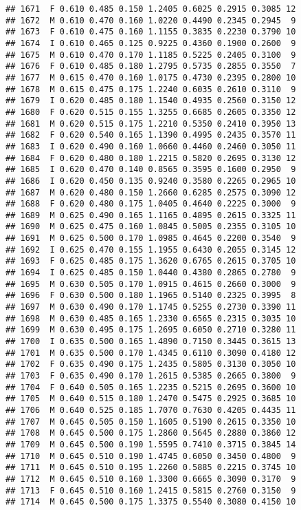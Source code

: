 \documentclass[
]{article}
\begin{document}
\begin{verbatim}
## 1671  F 0.610 0.485 0.150 1.2405 0.6025 0.2915 0.3085 12
## 1672  M 0.610 0.470 0.160 1.0220 0.4490 0.2345 0.2945  9
## 1673  F 0.610 0.475 0.160 1.1155 0.3835 0.2230 0.3790 10
## 1674  I 0.610 0.465 0.125 0.9225 0.4360 0.1900 0.2600  9
## 1675  M 0.610 0.470 0.170 1.1185 0.5225 0.2405 0.3100  9
## 1676  F 0.610 0.485 0.180 1.2795 0.5735 0.2855 0.3550  7
## 1677  M 0.615 0.470 0.160 1.0175 0.4730 0.2395 0.2800 10
## 1678  M 0.615 0.475 0.175 1.2240 0.6035 0.2610 0.3110  9
## 1679  I 0.620 0.485 0.180 1.1540 0.4935 0.2560 0.3150 12
## 1680  F 0.620 0.515 0.155 1.3255 0.6685 0.2605 0.3350 12
## 1681  M 0.620 0.515 0.175 1.2210 0.5350 0.2410 0.3950 13
## 1682  F 0.620 0.540 0.165 1.1390 0.4995 0.2435 0.3570 11
## 1683  I 0.620 0.490 0.160 1.0660 0.4460 0.2460 0.3050 11
## 1684  F 0.620 0.480 0.180 1.2215 0.5820 0.2695 0.3130 12
## 1685  I 0.620 0.470 0.140 0.8565 0.3595 0.1600 0.2950  9
## 1686  I 0.620 0.450 0.135 0.9240 0.3580 0.2265 0.2965 10
## 1687  M 0.620 0.480 0.150 1.2660 0.6285 0.2575 0.3090 12
## 1688  F 0.620 0.480 0.175 1.0405 0.4640 0.2225 0.3000  9
## 1689  M 0.625 0.490 0.165 1.1165 0.4895 0.2615 0.3325 11
## 1690  M 0.625 0.475 0.160 1.0845 0.5005 0.2355 0.3105 10
## 1691  M 0.625 0.500 0.170 1.0985 0.4645 0.2200 0.3540  9
## 1692  I 0.625 0.470 0.155 1.1955 0.6430 0.2055 0.3145 12
## 1693  F 0.625 0.485 0.175 1.3620 0.6765 0.2615 0.3705 10
## 1694  I 0.625 0.485 0.150 1.0440 0.4380 0.2865 0.2780  9
## 1695  M 0.630 0.505 0.170 1.0915 0.4615 0.2660 0.3000  9
## 1696  F 0.630 0.500 0.180 1.1965 0.5140 0.2325 0.3995  8
## 1697  M 0.630 0.490 0.170 1.1745 0.5255 0.2730 0.3390 11
## 1698  M 0.630 0.485 0.165 1.2330 0.6565 0.2315 0.3035 10
## 1699  M 0.630 0.495 0.175 1.2695 0.6050 0.2710 0.3280 11
## 1700  I 0.635 0.500 0.165 1.4890 0.7150 0.3445 0.3615 13
## 1701  M 0.635 0.500 0.170 1.4345 0.6110 0.3090 0.4180 12
## 1702  F 0.635 0.490 0.175 1.2435 0.5805 0.3130 0.3050 10
## 1703  F 0.635 0.490 0.170 1.2615 0.5385 0.2665 0.3800  9
## 1704  F 0.640 0.505 0.165 1.2235 0.5215 0.2695 0.3600 10
## 1705  M 0.640 0.515 0.180 1.2470 0.5475 0.2925 0.3685 10
## 1706  M 0.640 0.525 0.185 1.7070 0.7630 0.4205 0.4435 11
## 1707  M 0.645 0.505 0.150 1.1605 0.5190 0.2615 0.3350 10
## 1708  M 0.645 0.500 0.175 1.2860 0.5645 0.2880 0.3860 12
## 1709  M 0.645 0.500 0.190 1.5595 0.7410 0.3715 0.3845 14
## 1710  M 0.645 0.510 0.190 1.4745 0.6050 0.3450 0.4800  9
## 1711  M 0.645 0.510 0.195 1.2260 0.5885 0.2215 0.3745 10
## 1712  M 0.645 0.510 0.160 1.3300 0.6665 0.3090 0.3170  9
## 1713  F 0.645 0.510 0.160 1.2415 0.5815 0.2760 0.3150  9
## 1714  M 0.645 0.500 0.175 1.3375 0.5540 0.3080 0.4150 10

\end{verbatim}
\end{document}
